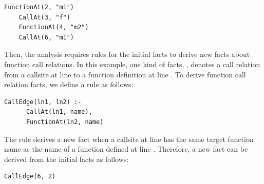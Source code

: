 
\begin{lstlisting}[style=mrule]
    FunctionAt(2, "m1")
    CallAt(3, "f")
    FunctionAt(4, "m2")
    CallAt(6, "m1")
\end{lstlisting}

Then, the analysis requires rules for the initial facts to derive new facts
about function call relations. In this example, one kind of facts, , denotes a call relation from a callsite at line 
to a function definition at line . To derive function call relation facts,
we define a rule as follows: 


\begin{lstlisting}[style=mrule]
    CallEdge(ln1, ln2) :-
      CallAt(ln1, name),
      FunctionAt(ln2, name)
\end{lstlisting}


\noindent
The rule derives a new fact  when a callsite at line
 has the same target function name as the name of a function defined
at line . Therefore, a new fact can be derived from the initial facts
as follows: 

\begin{lstlisting}[style=mrule]
    CallEdge(6, 2)
\end{lstlisting}

